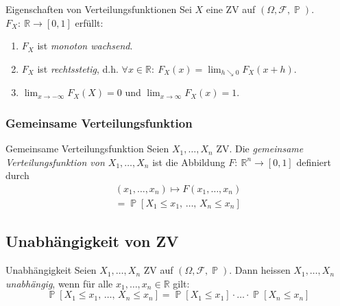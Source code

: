 \documentclass[a4paper,10pt]{article}
\def\R{\mathbb{R}}
\def\F{\mathcal{F}}
\renewcommand{\P}{\operatorname{\mathbb{P}}}
\numberwithin{equation}{section}
\begin{document}

\begin{mainbox}{Eigenschaften von Verteilungsfunktionen}
    Sei \( X \) eine ZV auf \( (\Omega, \F, \P) \). \( F_X: \: \R \to [0, 1] \) erfüllt:
    \begin{enumerate}[label=(\roman*)]
        \item \( F_X \) ist \emph{monoton wachsend}.
        \item \( F_X \) ist \emph{rechtsstetig}, d.h. \( \forall x \in \R: \: F_X(x) = \lim_{h \searrow 0} F_X(x + h) \).
        \item \( \lim_{x \to -\infty} F_X(X) = 0 \) und \( \lim_{x \to \infty} F_X(x) = 1 \).
    \end{enumerate}
\end{mainbox}

\subsubsection{Gemeinsame Verteilungsfunktion}

\begin{mainbox}{Gemeinsame Verteilungsfunktion}
    Seien \( X_1, \dots, X_n \) ZV. Die \emph{gemeinsame Verteilungsfunktion von \( X_1, \dots, X_n \)} ist die Abbildung \( F: \: \R^n \to [0, 1] \) definiert durch
    \begin{multline*}
        (x_1, \dots, x_n) \mapsto F(x_1, \dots, x_n) \\ = \P[X_1 \leq x_1, \, \dots, \, X_n \leq x_n]
    \end{multline*}
\end{mainbox}

\subsection{Unabhängigkeit von ZV}

\begin{mainbox}{Unabhängigkeit}
    Seien \( X_1, \dots, X_n \) ZV auf \( (\Omega, \F, \P) \). Dann heissen \( X_1, \dots, X_n \) \emph{unabhängig}, wenn für alle \( x_1, \dots, x_n \in \R \) gilt:
    \[
        \P[X_1 \leq x_1, \, \dots, \, X_n \leq x_n] = \P[X_1 \leq x_1] \cdot \dots \cdot \P[X_n \leq x_n]
    \]
\end{mainbox}
\end{document}
